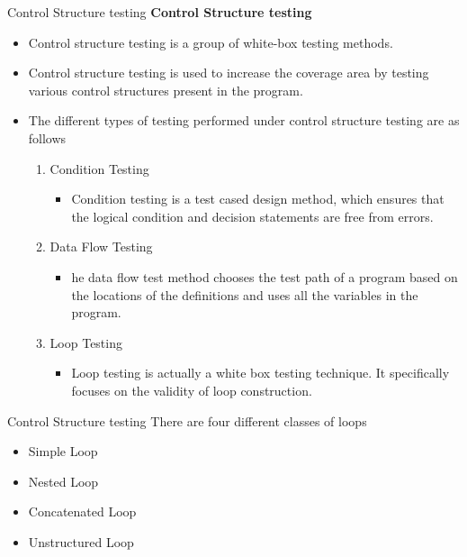 \documentclass{beamer}
\begin{document}
\begin{frame}{Control Structure testing}
	\textbf{Control Structure testing}
	\begin{itemize}
		\item Control structure testing is a group of white-box testing methods.
		\item Control structure testing is used to increase the coverage area by testing various control structures present in the program. \item The different types of testing performed under control structure testing are as follows
		\begin{enumerate}
			\item Condition Testing 
			\begin{itemize}
				\item Condition testing is a test cased design method, which ensures that the logical condition and decision statements are free from errors.
			\end{itemize}
			\item Data Flow Testing
			\begin{itemize}
				\item he data flow test method chooses the test path of a program based on the locations of the definitions and uses all the variables in the program. 
			\end{itemize}
			\item Loop Testing 
			\begin{itemize}
				\item Loop testing is actually a white box testing technique. It specifically focuses on the validity of loop construction.
			\end{itemize}
		\end{enumerate}
		
	\end{itemize}
\end{frame}
\begin{frame}{Control Structure testing}
There are four different classes of loops
\begin{itemize}
	\item Simple Loop
	\item Nested Loop
	\item Concatenated Loop
	\item Unstructured Loop
\end{itemize}
\end{frame}
\end{document}

